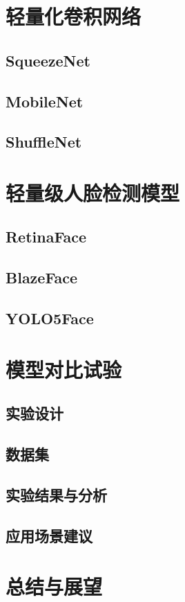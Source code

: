 \documentclass{article}
\begin{document}
\section{轻量化卷积网络}
\subsection{SqueezeNet}
\subsection{MobileNet}
\subsection{ShuffleNet}
\clearpage

\section{轻量级人脸检测模型}
\subsection{RetinaFace}
\subsection{BlazeFace}
\subsection{YOLO5Face}
\clearpage

\section{模型对比试验}
\subsection{实验设计}
\subsection{数据集}
\subsection{实验结果与分析}
\subsection{应用场景建议}
\clearpage

\section{总结与展望}
\clearpage


\end{document}
